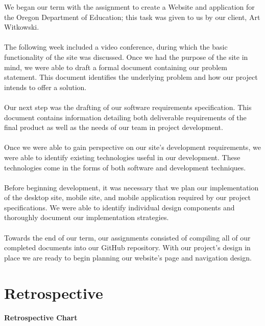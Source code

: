 \documentclass[onecolumn, draftclsnofoot,10pt, compsoc]{IEEEtran}
\begin{document}
\noindent We began our term with the assignment to create a Website and application for the Oregon Department of Education; this task was given to us by our client, Art Witkowski.
\\ \\
\noindent The following week included a video conference, during which the basic functionality of the site was discussed. Once we had the purpose of the site in mind, we were able to draft a formal document containing our problem statement. This document identifies the underlying problem and how our project intends to offer a solution. 
\\ \\
\noindent Our next step was the drafting of our software requirements specification. This document contains information detailing both deliverable requirements of the final product as well as the needs of our team in project development.
\\ \\
\noindent Once we were able to gain perspective on our site's development requirements, we were able to identify existing technologies useful in our development. These technologies come in the forms of both software and development techniques.
\\ \\
\noindent Before beginning development, it was necessary that we plan our implementation of the desktop site, mobile site, and mobile application required by our project specifications. We were able to identify individual design components and thoroughly document our implementation strategies.
\\ \\
\noindent Towards the end of our term, our assignments consisted of compiling all of our completed documents into our GitHub repository. With our project's design in place we are ready to begin planning our website's page and navigation design.


\section{Retrospective}
\vspace{0.6cm}



\center\textbf{Retrospective Chart}
\vspace{0.3cm}
\end{document}

